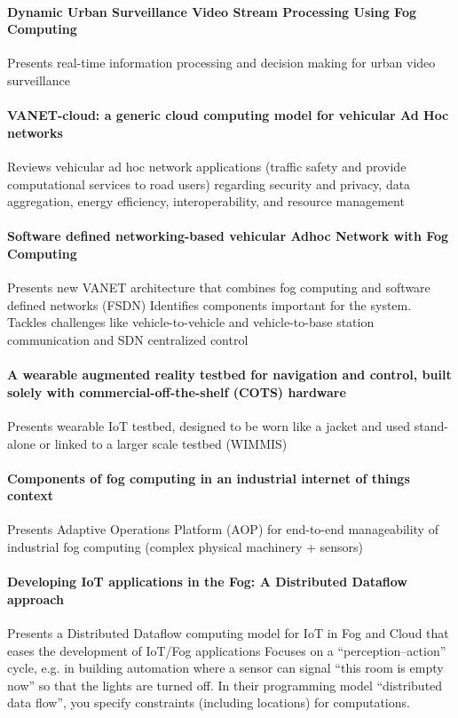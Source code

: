 \paragraph{Dynamic Urban Surveillance Video Stream Processing Using Fog Computing} \cite{chen_dynamic_2016}
Presents real-time information processing and decision making for urban video surveillance

\paragraph{VANET-cloud: a generic cloud computing model for vehicular Ad Hoc networks} \cite{bitam_vanet-cloud:_2015}
Reviews vehicular ad hoc network applications (traffic safety and provide computational services to road users) regarding
security and privacy, data aggregation, energy efficiency, interoperability, and resource management

\paragraph{Software defined networking-based vehicular Adhoc Network with Fog Computing} \cite{truong_software_2015}
Presents new VANET architecture that combines fog computing and software defined networks (FSDN)
Identifies components important for the system. Tackles challenges like vehicle-to-vehicle and vehicle-to-base station communication and SDN centralized control

\paragraph{A wearable augmented reality testbed for navigation and control, built solely with commercial-off-the-shelf (COTS) hardware} \cite{behringer_wearable_2000}
Presents wearable IoT testbed, designed to be worn like a jacket and used stand-alone or linked to a larger scale testbed (WIMMIS)

\paragraph{Components of fog computing in an industrial internet of things context}\cite{gazis_components_2015}
Presents Adaptive Operations Platform (AOP) for end-to-end manageability of industrial fog computing (complex physical machinery + sensors)

\paragraph{Developing IoT applications in the Fog: A Distributed Dataflow approach} \cite{giang_developing_2015}
Presents a Distributed Dataflow computing model for IoT in Fog and Cloud that eases the development of IoT/Fog applications
Focuses on a ``perception--action'' cycle, e.g. in building automation where a sensor can signal ``this room is empty now'' so that the lights are turned off. In their programming model ``distributed data flow'', you specify constraints (including locations) for computations.

